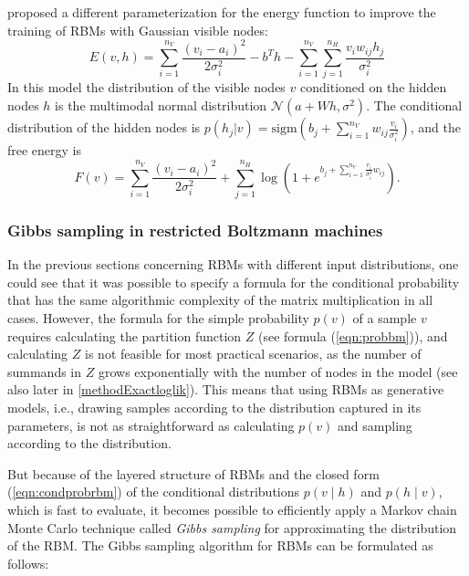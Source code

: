 \documentclass[12pt]{article}
\newcommand{\sigm}{\mathrm{sigm}}
\begin{document}
\cite{cho2011improved} proposed a different parameterization for the energy function to improve the training of RBMs with Gaussian visible nodes:
\begin{equation}
   E(v,h) = \sum_{i=1}^{n_V}\frac{(v_i - a_i)^2}{2\sigma_i^2} - b^T h - \sum_{i=1}^{n_V} \sum_{j=1}^{n_H} \frac{v_i w_{ij} h_j}{\sigma_i^2}
   \label{eqn:energyformulagbrbm2}
\end{equation}
In this model the distribution of the visible nodes $v$ conditioned on the hidden nodes $h$ is the multimodal normal distribution $\mathcal{N}(a + Wh, \sigma^2)$.
The conditional distribution of the hidden nodes is $p(h_j | v) = \sigm \left (b_j + \sum_{i=1}^{n_V} w_{ij} \frac{v_i}{\sigma_i^2} \right )$, and the free energy is
\begin{equation*}
   F(v) = \sum_{i=1}^{n_V}\frac{(v_i - a_i)^2}{2\sigma_i^2} + \sum_{j=1}^{n_H} \log \left (1 + e^{b_j + \sum_{i=1}^{n_V} \frac{v_i}{\sigma_i^2} w_{ij}} \right).
\end{equation*}



\subsubsection{Gibbs sampling in restricted Boltzmann machines}\label{gibbssamplingrbm}
In the previous sections concerning RBMs with different input distributions, one could see that it was possible to specify a formula for the conditional probability that has the same  algorithmic complexity of the matrix multiplication in all cases.
However, the formula for the simple probability $p(v)$ of a sample $v$ requires calculating the partition function $Z$ (see formula (\ref{eqn:probbm})), and calculating $Z$ is not feasible for most practical scenarios, as the number of summands in $Z$ grows exponentially with the number of nodes in the model (see also later in \ref{methodExactloglik}).
This means that using RBMs as generative models, i.e., drawing samples according to the distribution captured in its parameters, is not as straightforward as calculating $p(v)$ and sampling according to the distribution.

But because of the layered structure of RBMs and the closed form (\ref{eqn:condprobrbm}) of the conditional distributions $p(v \mid h)$ and $p(h \mid v)$, which is fast to evaluate, it becomes possible to efficiently apply a Markov chain Monte Carlo technique \citep{mcmc_handbook_2011} called \emph{Gibbs sampling} \citep{gibbssamplingorig} for approximating the distribution of the RBM.
The Gibbs sampling  algorithm for RBMs can be formulated as follows:
\end{document}
